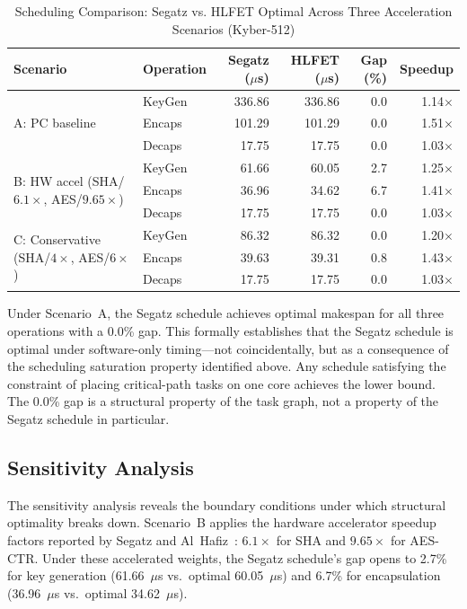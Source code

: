 \documentclass[journal]{IEEEtran}
\begin{document}
\begin{table}[!t]
\renewcommand{\arraystretch}{1.15}
\caption{Scheduling Comparison: Segatz vs. HLFET Optimal Across Three Acceleration Scenarios (Kyber-512)}
\label{tab:scheduling}
\centering
\begin{tabular}{l l r r r r}
\toprule
\textbf{Scenario} & \textbf{Operation} & \textbf{Segatz ($\mu$s)} & \textbf{HLFET ($\mu$s)} & \textbf{Gap (\%)} & \textbf{Speedup} \\
\midrule
\multirow{3}{*}{A: PC baseline} & KeyGen & 336.86 & 336.86 & 0.0 & 1.14$\times$ \\
 & Encaps & 101.29 & 101.29 & 0.0 & 1.51$\times$ \\
 & Decaps &  17.75 &  17.75 & 0.0 & 1.03$\times$ \\
\midrule
\multirow{3}{*}{B: HW accel (SHA/$6.1\times$, AES/$9.65\times$)} & KeyGen &  61.66 &  60.05 & 2.7 & 1.25$\times$ \\
 & Encaps &  36.96 &  34.62 & 6.7 & 1.41$\times$ \\
 & Decaps &  17.75 &  17.75 & 0.0 & 1.03$\times$ \\
\midrule
\multirow{3}{*}{C: Conservative (SHA/$4\times$, AES/$6\times$)} & KeyGen &  86.32 &  86.32 & 0.0 & 1.20$\times$ \\
 & Encaps &  39.63 &  39.31 & 0.8 & 1.43$\times$ \\
 & Decaps &  17.75 &  17.75 & 0.0 & 1.03$\times$ \\
\bottomrule
\end{tabular}
\end{table}

Under Scenario~A, the Segatz schedule achieves optimal makespan for all three operations with a 0.0\% gap. This formally establishes that the Segatz schedule is optimal under software-only timing---not coincidentally, but as a consequence of the scheduling saturation property identified above. Any schedule satisfying the constraint of placing critical-path tasks on one core achieves the lower bound. The 0.0\% gap is a structural property of the task graph, not a property of the Segatz schedule in particular.

\subsection{Sensitivity Analysis}
\label{sec:sensitivity}

The sensitivity analysis reveals the boundary conditions under which structural optimality breaks down. Scenario~B applies the hardware accelerator speedup factors reported by Segatz and Al~Hafiz~\cite{segatz2022}: $6.1\times$ for SHA and $9.65\times$ for AES-CTR. Under these accelerated weights, the Segatz schedule's gap opens to 2.7\% for key generation (61.66~$\mu$s vs.\ optimal 60.05~$\mu$s) and 6.7\% for encapsulation (36.96~$\mu$s vs.\ optimal 34.62~$\mu$s).
\end{document}
